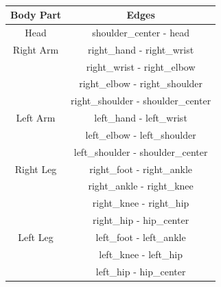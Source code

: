 \begin{table}[H]
    \centering
    \renewcommand{\arraystretch}{0.85}
    
    \begin{subtable}{\textwidth}
        \centering
        \begin{tabular}{|c|c|}
            \hline
            \textbf{Body Part} & \textbf{Edges} \\
            \hline
            Head & shoulder\_center - head \\
            \hline
            Right Arm & right\_hand - right\_wrist \\
            & right\_wrist - right\_elbow \\
            & right\_elbow - right\_shoulder \\
            & right\_shoulder - shoulder\_center \\
            \hline
            Left Arm & left\_hand - left\_wrist \\
            & left\_elbow - left\_shoulder \\
            & left\_shoulder - shoulder\_center \\
            \hline
            Right Leg & right\_foot - right\_ankle \\
            & right\_ankle - right\_knee \\
            & right\_knee - right\_hip \\
            & right\_hip - hip\_center \\
            \hline
            Left Leg & left\_foot - left\_ankle \\
            & left\_knee - left\_hip \\
            & left\_hip - hip\_center \\
            \hline
        \end{tabular}
        \caption{}
        \label{tab:body_division_5}
    \end{subtable}

    \vspace{10pt} %


\end{table}
